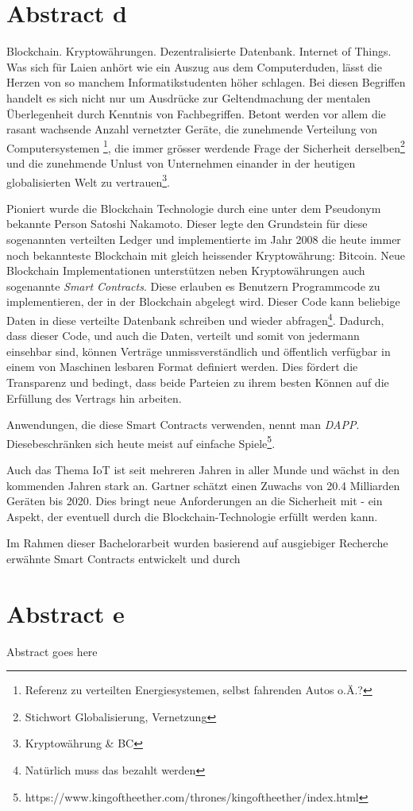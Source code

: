 \chapter{Abstract d}
\label{cha:abstract_d}

Blockchain. Kryptowährungen. Dezentralisierte Datenbank. Internet of Things. Was sich für Laien anhört wie ein Auszug aus dem Computerduden, lässt die Herzen von so manchem Informatikstudenten höher schlagen. Bei diesen Begriffen handelt es sich nicht nur um Ausdrücke zur Geltendmachung der mentalen Überlegenheit durch Kenntnis von Fachbegriffen. Betont werden vor allem die rasant wachsende Anzahl vernetzter Geräte, die zunehmende Verteilung von Computersystemen \footnote{Referenz zu verteilten Energiesystemen, selbst fahrenden Autos o.Ä.?}, die immer grösser werdende Frage der Sicherheit derselben\footnote{Stichwort Globalisierung, Vernetzung} und die zunehmende Unlust von Unternehmen einander in der heutigen globalisierten Welt zu vertrauen\footnote{Kryptowährung \& BC}.

Pioniert wurde die Blockchain Technologie durch eine unter dem Pseudonym bekannte Person Satoshi Nakamoto. Dieser legte den Grundstein für diese sogenannten verteilten Ledger und implementierte im Jahr 2008 die heute immer noch bekannteste Blockchain mit gleich heissender Kryptowährung: Bitcoin. Neue Blockchain Implementationen unterstützen neben Kryptowährungen auch sogenannte \emph{Smart Contracts}. Diese erlauben es Benutzern Programmcode zu implementieren, der in der Blockchain abgelegt wird. Dieser Code kann beliebige Daten in diese verteilte Datenbank schreiben und wieder abfragen\footnote{Natürlich muss das bezahlt werden}. Dadurch, dass dieser Code, und auch die Daten, verteilt und somit von jedermann einsehbar sind, können Verträge unmissverständlich und öffentlich verfügbar in einem von Maschinen lesbaren Format definiert werden. Dies fördert die Transparenz und bedingt, dass beide Parteien zu ihrem besten Können auf die Erfüllung des Vertrags hin arbeiten.

Anwendungen, die diese Smart Contracts verwenden, nennt man \emph{\acrfull{DAPP}}. Diesebeschränken sich heute meist auf einfache Spiele\footnote{https://www.kingoftheether.com/thrones/kingoftheether/index.html}.


\cite{BlockchainRevolution}

Auch das Thema \acrshort{IoT} ist seit mehreren Jahren in aller Munde und wächst in den kommenden Jahren stark an. Gartner schätzt einen Zuwachs von 20.4 Milliarden Geräten bis 2020. Dies bringt neue Anforderungen an die Sicherheit mit - ein Aspekt, der eventuell durch die Blockchain-Technologie erfüllt werden kann.\cite{gartner.com_iot,BlockchainRevolution}

Im Rahmen dieser Bachelorarbeit wurden basierend auf ausgiebiger Recherche erwähnte Smart Contracts entwickelt und durch 


\chapter{Abstract e}
\label{cha:abstract_e}

Abstract goes here
